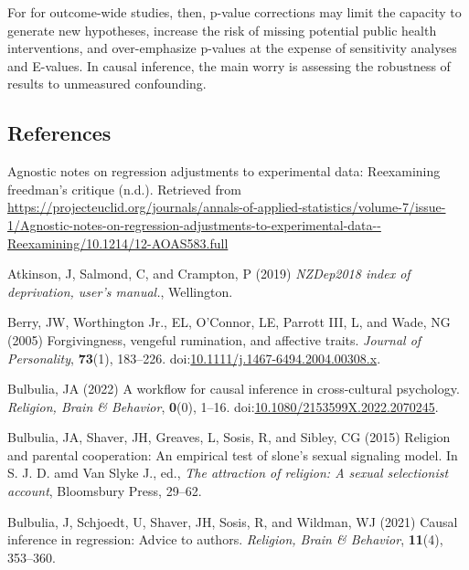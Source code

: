 \documentclass[
  singlecolumn,
  9pt]{article}
\newlength{\cslhangindent}
\newenvironment{CSLReferences}[2] %
 {\begin{list}{}{%
  \setlength{\itemindent}{0pt}
  \setlength{\leftmargin}{0pt}
  \setlength{\parsep}{0pt}
  \ifodd #1
   \setlength{\leftmargin}{\cslhangindent}
   \setlength{\itemindent}{-1\cslhangindent}
  \fi
  \setlength{\itemsep}{#2\baselineskip}}}
 {\end{list}}
\begin{document}
For for outcome-wide studies, then, p-value corrections may limit the
capacity to generate new hypotheses, increase the risk of missing
potential public health interventions, and over-emphasize p-values at
the expense of sensitivity analyses and E-values. In causal inference,
the main worry is assessing the robustness of results to unmeasured
confounding.

\newpage{}

\subsection*{References}\label{references}

\label{refs}
\begin{CSLReferences}{1}{0}
Agnostic notes on regression adjustments to experimental data:
Reexamining freedman{'}s critique (n.d.). Retrieved from
\url{https://projecteuclid.org/journals/annals-of-applied-statistics/volume-7/issue-1/Agnostic-notes-on-regression-adjustments-to-experimental-data--Reexamining/10.1214/12-AOAS583.full}

Atkinson, J, Salmond, C, and Crampton, P (2019) \emph{NZDep2018 index of
deprivation, user{'}s manual.}, Wellington.

Berry, JW, Worthington Jr., EL, O'Connor, LE, Parrott III, L, and Wade,
NG (2005) Forgivingness, vengeful rumination, and affective traits.
\emph{Journal of Personality}, \textbf{73}(1), 183--226.
doi:\href{https://doi.org/10.1111/j.1467-6494.2004.00308.x}{10.1111/j.1467-6494.2004.00308.x}.

Bulbulia, JA (2022) A workflow for causal inference in cross-cultural
psychology. \emph{Religion, Brain \& Behavior}, \textbf{0}(0), 1--16.
doi:\href{https://doi.org/10.1080/2153599X.2022.2070245}{10.1080/2153599X.2022.2070245}.

Bulbulia, JA, Shaver, JH, Greaves, L, Sosis, R, and Sibley, CG (2015)
Religion and parental cooperation: An empirical test of slone's sexual
signaling model. In S. J. D. amd Van Slyke J., ed., \emph{The attraction
of religion: A sexual selectionist account}, Bloomsbury Press, 29--62.

Bulbulia, J, Schjoedt, U, Shaver, JH, Sosis, R, and Wildman, WJ (2021)
Causal inference in regression: Advice to authors. \emph{Religion, Brain
\& Behavior}, \textbf{11}(4), 353--360.


\end{CSLReferences}
\end{document}
